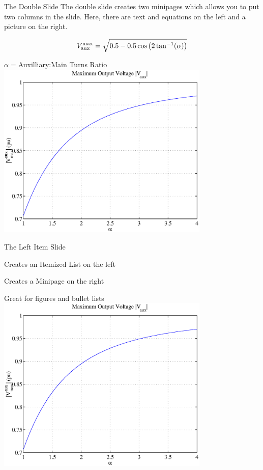 \documentclass{uwmslide}
\begin{document}
\begin{doubleslide}{The Double Slide}
The double slide creates two minipages which allows you to put two columns in the
slide.  Here, there are text and equations on the left and a picture on the right.

\[V_{\rm aux}^{\rm max}=\sqrt{0.5 - 0.5\cos\left(2\tan^{-1}(\alpha)\right)}\]

$\alpha=$Auxilliary:Main Turns Ratio
\slidedivider
\includegraphics[width=4in]{vaux.eps}
\end{doubleslide}

\begin{leftitem}{The Left Item Slide}
\item Creates an Itemized List on the left
\item Creates a Minipage on the right
\item Great for figures and bullet lists
\slidedivider
\includegraphics[width=4in]{vaux.eps}
\end{leftitem}
\end{document}
